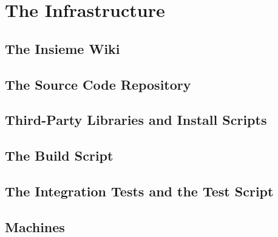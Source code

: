 \chapter{The Infrastructure} \label{cap:infrastructure}

\section{The Insieme Wiki}
\section{The Source Code Repository}
\section{Third-Party Libraries and Install Scripts}
\section{The Build Script}
\section{The Integration Tests and the Test Script}
\section{Machines}
